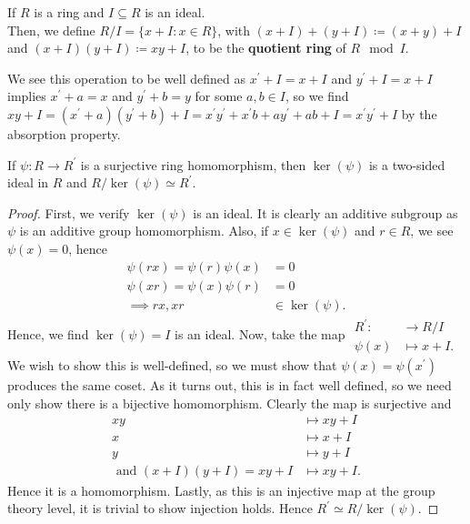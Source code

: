 \begin{definition}
	If \(R\) is a ring and \(I \subseteq R\) is an ideal. \\ Then, we define \(R / I = \{x + I : x \in R\} \), with \(\left( x + I \right)  + \left( y + I \right) \coloneqq \left( x + y \right) + I\) and \(\left( x + I \right) \left( y + I \right)  \coloneqq xy + I\),   to be the \textbf{quotient ring} of \(R \mod I\).
\end{definition}
We see this operation to be well defined as \(x^{\prime} + I = x + I\) and \(y^{\prime} + I = x + I\) implies \(x^{\prime} + a = x\) and \(y^{\prime} + b = y\) for some \(a,b \in I\), so we find \(xy + I = \left( x^{\prime} + a \right) \left( y^{\prime} + b \right) + I = x^{\prime}y^{\prime} + x^{\prime} b + ay^{\prime} + ab + I = x^{\prime} y^{\prime} + I \) by the absorption property.
\begin{theorem}
If \(\psi: R \to R^{\prime}\) 	is a surjective ring homomorphism, then \(\ker \left( \psi \right) \) is a two-sided ideal in \(R\) and \(R / \ker \left( \psi \right) \simeq R^{\prime} \).
\end{theorem}
\begin{proof}
	First, we verify \(\ker \left( \psi \right) \) 	is an ideal. It is clearly an additive subgroup as \(\psi\) is an additive group homomorphism. Also, if \(x \in \ker \left( \psi \right) \) and \(r \in R\), we see \(\psi\left( x \right)  = 0\), hence
	\begin{align*}
		\psi\left( rx \right)  = \psi\left( r \right) \psi\left( x \right) &=  0 \\
		\psi\left( xr \right) = \psi\left( x \right) \psi\left( r \right) &= 0 \\
		\implies rx, xr &\in \ker \left( \psi \right)
	.\end{align*}
Hence, we find \(\ker \left( \psi \right) = I\) is an ideal. Now, take the map \(\begin{align*}
	R^{\prime}:  &\longrightarrow R / I  \\
	\psi\left( x \right)  &\longmapsto x + I
.\end{align*}\)
We wish to show this is well-defined, so we must show that \(\psi\left( x \right)  = \psi\left( x^{\prime} \right) \) produces the same coset. As it turns out, this is in fact well defined, so we need only show there is a bijective homomorphism. Clearly the map is surjective and
\begin{align*}
	xy &\mapsto xy + I\\
	x &\mapsto x + I\\
	y &\mapsto y + I\\
	\text{ and } \left( x + I \right) \left( y + I \right) = xy + I &\mapsto xy + I
.\end{align*}
Hence it is a homomorphism. Lastly, as this is an injective map at the group theory level, it is trivial to show injection holds. Hence \(R^{\prime} \simeq R / \ker \left( \psi \right) \).
\end{proof}
